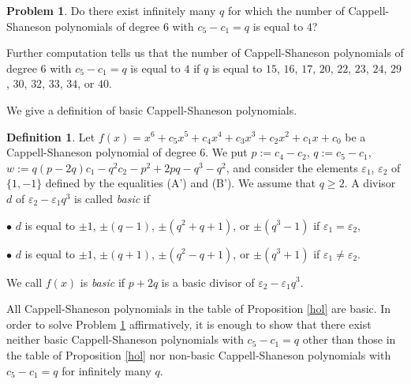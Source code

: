 \documentclass{amsart}
\theoremstyle{plain}
\theoremstyle{definition}
\newtheorem{defn}[thm]{Definition}
\newtheorem{prob}[thm]{Problem}
\theoremstyle{remark}
\begin{document}
\begin{prob}\label{exist}
Do there exist infinitely many $q$ for which the number of Cappell-Shaneson polynomials of degree $6$ 
with $c_5-c_1=q$ is equal to $4$?
\end{prob}

Further computation tells us that 
the number of Cappell-Shaneson polynomials of degree $6$ 
with $c_5-c_1=q$ is equal to $4$ if $q$ is equal to 
$15$, $16$, $17$, $20$, $22$, $23$, $24$, $29$, $30$, $32$, $33$, $34$, or $40$. 

We give a definition of basic Cappell-Shaneson polynomials. 

\begin{defn}
Let $f(x)=x^6+c_5x^5+c_4x^4+c_3x^3+c_2x^2+c_1x+c_0$ be a Cappell-Shaneson polynomial of 
degree $6$. We put $p:=c_4-c_2$, $q:=c_5-c_1$, $w:=q(p-2q)c_1-q^2c_2-p^2+2pq-q^3-q^2$, 
and consider the elements $\varepsilon_1$, $\varepsilon_2$ of $\{1,-1\}$ 
defined by the equalities (A') and (B'). We assume that $q\geq 2$. 
A divisor $d$ of $\varepsilon_2-\varepsilon_1q^3$ is called {\it basic} if 

$\bullet$ $d$ is equal to 
$\pm 1$, $\pm (q-1)$, $\pm (q^2+q+1)$, or $\pm (q^3-1)$ if $\varepsilon_1=\varepsilon_2$, 

$\bullet$ 
$d$ is equal to $\pm 1$, $\pm (q+1)$, $\pm (q^2-q+1)$, or $\pm (q^3+1)$ if 
$\varepsilon_1\ne\varepsilon_2$. 

\noindent
We call $f(x)$ is {\it basic} if $p+2q$ is a basic divisor of 
$\varepsilon_2-\varepsilon_1q^3$. 
\end{defn}

All Cappell-Shaneson polynomials in the table of Proposition \ref{hol} are basic. 
In order to solve Problem \ref{exist} affirmatively, it is enough to show that there exist neither 
basic Cappell-Shaneson polynomials with $c_5-c_1=q$ other than those 
in the table of Proposition \ref{hol} 
nor non-basic Cappell-Shaneson polynomials with $c_5-c_1=q$ for infinitely many $q$. 
\end{document}
